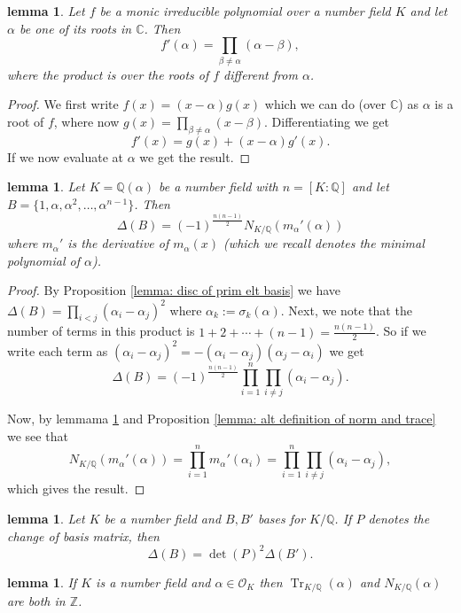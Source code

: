 \documentclass[11pt,a4paper]{amsart}
\theoremstyle{plain}
\newtheorem{lemma}[subsection]{lemma}
\theoremstyle{definition}
\theoremstyle{definition}
\newcommand{\Tr}{\operatorname{Tr}}
\newcommand{\ZZ}{\mathbb{Z}}
\def\CC{\mathbb{C}}
\def\QQ{\mathbb{Q}}
\def \a{\alpha}
\def \OO {\mathcal{O}}
\begin{document}
	\begin{lemma}\label{lemma: diff of irr pol}
		Let $f$ be a monic irreducible polynomial over a number field $K$ and let $\a$ be one of its roots in $\CC$. Then \[f'(\a)=\prod_{\beta \neq \a} (\a-\beta),  \] where the product is over the roots of $f$ different from $\a$.
	\end{lemma}
	
	\begin{proof}
		We first write $f(x)=(x-\a)g(x)$ which we can do (over $\CC$) as $\a$ is a root of $f$, where now $g(x)=\prod_{\beta \neq \a} (x-\beta)$. Differentiating we get \[f'(x)=g(x)+(x-\a)g'(x).\] If we now evaluate at $\a$ we get the result.
	\end{proof}
	
	\begin{lemma}\label{lemma: num field disc in terms of norm}
		Let $K=\QQ(\a)$ be a number field with $n=[K:\QQ]$ and let $B=\{1,\a,\a^2,\dots,\a^{n-1}\}$. Then \[\Delta(B)=(-1)^{\frac{n(n-1)}{2}}N_{K/\QQ}(m_\a'(\a))\] where $m_\a'$ is the derivative of $m_\a(x)$ (which we recall denotes the minimal polynomial of $\a$).	
	\end{lemma}
	\begin{proof}
		By Proposition \ref{lemma: disc of prim elt basis} we have $\Delta(B)=\prod_{i < j}(\a_i-\a_j)^2$ where $\a_k:=\sigma_k(\a)$. Next, we note that the number of terms in this product is $1+2+\cdots+(n-1)=\frac{n(n-1)}{2}$. So if we write each term as $(\a_i-\a_j)^2=-(\a_i-\a_j)(\a_j-\a_i)$ we get \[\Delta(B)=(-1)^{\frac{n(n-1)}{2}}\prod_{i=1}^n \prod_{i \neq j} (\a_i-\a_j). \]
		
		Now, by lemmama \ref{lemma: diff of irr pol} and Proposition \ref{lemma: alt definition of norm and trace} we see that \[N_{K/\QQ}(m_\a'(\a))=\prod_{i=1}^n m_\a'(\a_i)=\prod_{i=1}^n \prod_{i \neq j} (\a_i-\a_j),\] which gives the result.	
	\end{proof}	
	
	\begin{lemma}\label{lemma: disc change of basis}
		Let $K$ be a number field and $B,B'$ bases for $K/\QQ$. If $P$ denotes the change of basis matrix, then \[\Delta(B)=\det(P)^2 \Delta(B').\]
	\end{lemma}
	
	\begin{lemma}\label{lemma: norm trace of alg int is int}
		If $K$ is a number field and $\a \in \OO_K$ then $\Tr_{K/\QQ}(\a)$ and $N_{K/\QQ}(\a)$ are both in $\ZZ$. 
	\end{lemma}	
	
\end{document}
